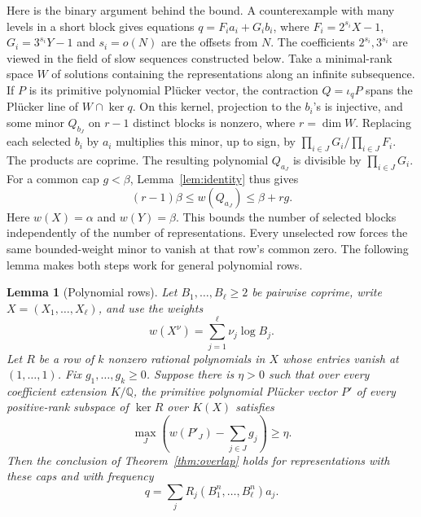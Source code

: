 \documentclass[11pt,a4paper,reqno]{amsart}
\newtheorem{lemma}[theorem]{Lemma}
\theoremstyle{definition}
\theoremstyle{remark}
\numberwithin{equation}{section}
\begin{document}
Here is the binary argument behind the bound. A counterexample
with many levels in a short block gives equations
\(q=F_i a_i+G_i b_i\), where \(F_i=2^{s_i}X-1\),
\(G_i=3^{s_i}Y-1\) and \(s_i=o(N)\) are the offsets from \(N\).
The coefficients \(2^{s_i},3^{s_i}\) are viewed in the field
of slow sequences constructed below. Take a minimal-rank space
\(W\) of solutions containing the representations along an
infinite subsequence. If \(P\) is its primitive polynomial
Pl\"ucker vector, the contraction \(Q=\iota_q P\) spans the
Pl\"ucker line of \(W\cap\ker q\). On this kernel, projection
to the \(b_i\)'s is injective, and some minor \(Q_{b_J}\) on
\(r-1\) distinct blocks is nonzero, where \(r=\dim W\).
Replacing each selected \(b_i\) by \(a_i\) multiplies this
minor, up to sign, by \(\prod_{i\in J}G_i/\prod_{i\in J}F_i\).
The products are coprime. The resulting polynomial \(Q_{a_J}\)
is divisible by \(\prod_{i\in J}G_i\). For a common cap
\(g<\beta\), Lemma~\ref{lem:identity} thus gives
\[
   (r-1)\beta\le w(Q_{a_J})\le \beta+rg .
\]
Here \(w(X)=\alpha\) and \(w(Y)=\beta\). This bounds the number
of selected blocks independently of the number of representations.
Every unselected row forces the same bounded-weight minor to
vanish at that row's common zero. The following lemma makes
both steps work for general polynomial rows.

\begin{lemma}[Polynomial rows]\label{lem:row-overlap}
Let \(B_1,\ldots,B_\ell\ge2\) be pairwise coprime, write
\(X=(X_1,\ldots,X_\ell)\), and use the weights
\[
                   w(X^\nu)=\sum_{j=1}^{\ell}\nu_j\log B_j .
\]
Let \(R\) be a row of \(k\) nonzero rational polynomials in \(X\)
whose entries vanish at \((1,\ldots,1)\).
Fix \(g_1,\ldots,g_k\ge0\). Suppose there is \(\eta>0\) such
that over every coefficient extension \(K/\mathbb Q\), the
primitive polynomial Pl\"ucker vector \(P'\) of every positive-rank
subspace of \(\ker R\) over \(K(X)\) satisfies
\[
   \max_J\left(w(P'_J)-\sum_{j\in J}g_j\right)\ge\eta .
\]
Then the conclusion of Theorem~\ref{thm:overlap} holds for
representations with these caps and with frequency
\[
                    q=\sum_j R_j(B_1^n,\ldots,B_\ell^n)a_j .
\]
\end{lemma}
\end{document}
